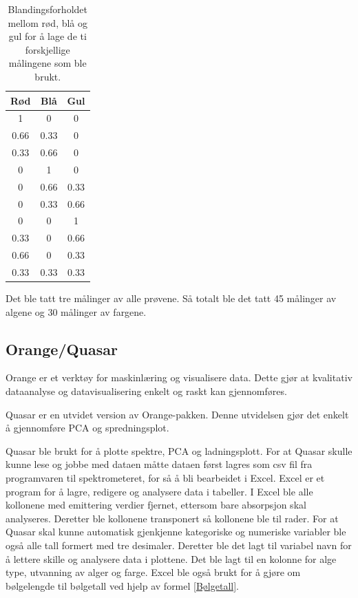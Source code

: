 \documentclass[twocolumn, 11pt]{article} %
\begin{document}
\begin{table}[H]
\centering
 \begin{tabular}{||c c c||} 
 \hline
 Rød & Blå & Gul\\ [0.5ex] 
 \hline\hline
 1 & 0 & 0 \\
 0.66 & 0.33 & 0 \\
 0.33 & 0.66 & 0 \\
  0 & 1 & 0 \\
 0 & 0.66 & 0.33 \\
 0 & 0.33 & 0.66 \\
 0 & 0 & 1 \\
 0.33 & 0 & 0.66 \\
 0.66 & 0 & 0.33 \\ 
 0.33 & 0.33 & 0.33 \\[1ex] 
 \hline
 \end{tabular}
 \caption{Blandingsforholdet mellom rød, blå og gul for å lage de ti forskjellige målingene som ble brukt.}
 \label{Simplex Lattice Design}
\end{table}


Det ble tatt tre målinger av alle prøvene. Så totalt ble det tatt 45 målinger av algene og 30 målinger av fargene. 

\subsection{Orange/Quasar}
Orange er et verktøy for maskinlæring og visualisere data. Dette gjør at kvalitativ dataanalyse og datavisualisering enkelt og raskt kan gjennomføres\cite{Orange}.

Quasar er en utvidet version av Orange-pakken. Denne utvidelsen gjør det enkelt å gjennomføre PCA og spredningsplot\cite{Quasar}.

\bigskip

Quasar ble brukt for å plotte spektre, PCA og ladningsplott. For at Quasar skulle kunne lese og jobbe med dataen måtte dataen først lagres som csv fil fra programvaren til spektrometeret, for så å bli bearbeidet i Excel. Excel er et program for å lagre, redigere og analysere data i tabeller.
I Excel ble alle kollonene med emittering verdier fjernet, ettersom bare absorpsjon skal analyseres. Deretter ble kollonene transponert så kollonene ble til rader. 
For at Quasar skal kunne automatisk gjenkjenne kategoriske og numeriske variabler ble også alle tall formert med tre desimaler. Deretter ble det lagt til variabel navn for å lettere skille og analysere data i plottene. Det ble lagt til en kolonne for alge type, utvanning av alger og farge.
Excel ble også brukt for å gjøre om bølgelengde til bølgetall ved hjelp av formel \eqref{Bølgetall}.
\end{document}
